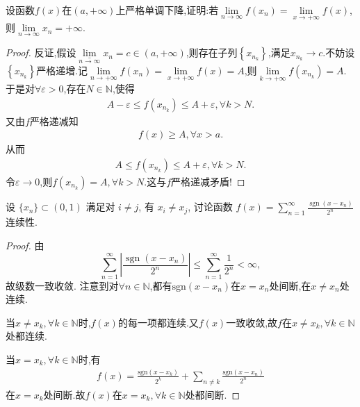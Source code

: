 \documentclass[../../main.tex]{subfiles}
\begin{document}
\begin{example}
设函数$f(x)$在$(a,+\infty)$上严格单调下降,证明:若$\lim\limits_{n \to \infty} f(x_n)=\lim\limits_{x \to +\infty} f(x)$,则$\lim\limits_{n \to \infty} x_n=+\infty$. 
\end{example}
\begin{proof}
反证,假设$\underset{n\rightarrow \infty}{\underline{\lim }}x_n=c\in \left( a,+\infty \right) $,则存在子列$\left\{ x_{n_k} \right\} $,满足$x_{n_k}\rightarrow c$.不妨设$\left\{ x_{n_k} \right\} $严格递增.记$\underset{n\rightarrow +\infty}{\lim}f\left( x_n \right) =\underset{x\rightarrow +\infty}{\lim}f\left( x \right) =A$,则$\underset{k\rightarrow +\infty}{\lim}f\left( x_{n_k} \right) =A$.于是对$\forall \varepsilon >0$,存在$N\in \mathbb{N} $,使得
\begin{align*}
A-\varepsilon \leqslant f\left( x_{n_k} \right) \leqslant A+\varepsilon ,\forall k>N.
\end{align*}
又由$f$严格递减知
\begin{align*}
f\left( x \right) \geqslant A,\forall x>a.
\end{align*}
从而
\begin{align*}
A\leqslant f\left( x_{n_k} \right) \leqslant A+\varepsilon ,\forall k>N.
\end{align*}
令$\varepsilon \rightarrow 0$,则$f\left( x_{n_k} \right) =A,\forall k>N$.这与$f$严格递减矛盾!
\end{proof}

\begin{example}
设 $\{x_n\} \subset (0,1)$ 满足对 $i \neq j$, 有 $x_i \neq x_j$, 讨论函数 $f(x) = \sum_{n=1}^\infty \frac{\operatorname{sgn}(x - x_n)}{2^n}$ 连续性.
\end{example}
\begin{proof}
由
\[
\sum_{n=1}^\infty \left| \frac{\operatorname{sgn}(x - x_n)}{2^n} \right| \leqslant \sum_{n=1}^\infty \frac{1}{2^n} < \infty,
\]
故级数一致收敛. 注意到对$\forall n\in \mathbb{N} $,都有$\mathrm{sgn} \left( x-x_n \right) $在$x=x_n$处间断,在$x\ne x_n$处连续.

当$x\ne x_k,\forall k\in \mathbb{N} $时,$f\left( x \right) $的每一项都连续.又$f\left( x \right) $一致收敛,故$f$在$x\ne x_k,\forall k\in \mathbb{N} $处都连续.

当$x=x_k,\forall k\in \mathbb{N} $时,有
\begin{align*}
f\left( x \right) =\frac{\mathrm{sgn} \left( x-x_k \right)}{2^k}+\sum_{n\ne k}{\frac{\mathrm{sgn} \left( x-x_n \right)}{2^n}}
\end{align*}
在$x=x_k$处间断.故$f\left( x \right) $在$x=x_k,\forall k\in \mathbb{N} $处都间断.
\end{proof}
\end{document}
